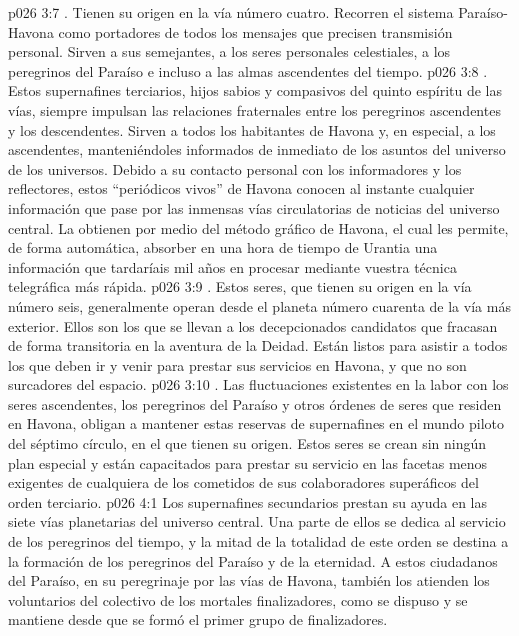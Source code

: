 \vs p026 3:7 . Tienen su origen en la vía número cuatro. Recorren el sistema Paraíso\hyp{}Havona como portadores de todos los mensajes que precisen transmisión personal. Sirven a sus semejantes, a los seres personales celestiales, a los peregrinos del Paraíso e incluso a las almas ascendentes del tiempo.
\vs p026 3:8 . Estos supernafines terciarios, hijos sabios y compasivos del quinto espíritu de las vías, siempre impulsan las relaciones fraternales entre los peregrinos ascendentes y los descendentes. Sirven a todos los habitantes de Havona y, en especial, a los ascendentes, manteniéndoles informados de inmediato de los asuntos del universo de los universos. Debido a su contacto personal con los informadores y los reflectores, estos “periódicos vivos” de Havona conocen al instante cualquier información que pase por las inmensas vías circulatorias de noticias del universo central. La obtienen por medio del método gráfico de Havona, el cual les permite, de forma automática, absorber en una hora de tiempo de Urantia una información que tardaríais mil años en procesar mediante vuestra técnica telegráfica más rápida.
\vs p026 3:9 . Estos seres, que tienen su origen en la vía número seis, generalmente operan desde el planeta número cuarenta de la vía más exterior. Ellos son los que se llevan a los decepcionados candidatos que fracasan de forma transitoria en la aventura de la Deidad. Están listos para asistir a todos los que deben ir y venir para prestar sus servicios en Havona, y que no son surcadores del espacio.
\vs p026 3:10 . Las fluctuaciones existentes en la labor con los seres ascendentes, los peregrinos del Paraíso y otros órdenes de seres que residen en Havona, obligan a mantener estas reservas de supernafines en el mundo piloto del séptimo círculo, en el que tienen su origen. Estos seres se crean sin ningún plan especial y están capacitados para prestar su servicio en las facetas menos exigentes de cualquiera de los cometidos de sus colaboradores superáficos del orden terciario.
\vs p026 4:1 Los supernafines secundarios prestan su ayuda en las siete vías planetarias del universo central. Una parte de ellos se dedica al servicio de los peregrinos del tiempo, y la mitad de la totalidad de este orden se destina a la formación de los peregrinos del Paraíso y de la eternidad. A estos ciudadanos del Paraíso, en su peregrinaje por las vías de Havona, también los atienden los voluntarios del colectivo de los mortales finalizadores, como se dispuso y se mantiene desde que se formó el primer grupo de finalizadores.
